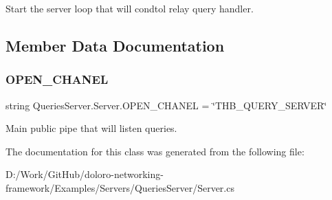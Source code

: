 Start the server loop that will condtol relay query handler. 



\subsection{Member Data Documentation}
\mbox{\label{class_queries_server_1_1_server_a5d7c4c9ababa7292ef7cac92005d3563}} 
\subsubsection{\texorpdfstring{O\+P\+E\+N\+\_\+\+C\+H\+A\+N\+EL}{OPEN\_CHANEL}}
{\footnotesize\ttfamily string Queries\+Server.\+Server.\+O\+P\+E\+N\+\_\+\+C\+H\+A\+N\+EL = \char`\"{}T\+H\+B\+\_\+\+Q\+U\+E\+R\+Y\+\_\+\+S\+E\+R\+V\+ER\char`\"{}\hspace{0.3cm}{\ttfamily [static]}}



Main public pipe that will listen queries. 



The documentation for this class was generated from the following file\+:\begin{DoxyCompactItemize}
\item 
D\+:/\+Work/\+Git\+Hub/doloro-\/networking-\/framework/\+Examples/\+Servers/\+Queries\+Server/Server.\+cs\end{DoxyCompactItemize}
